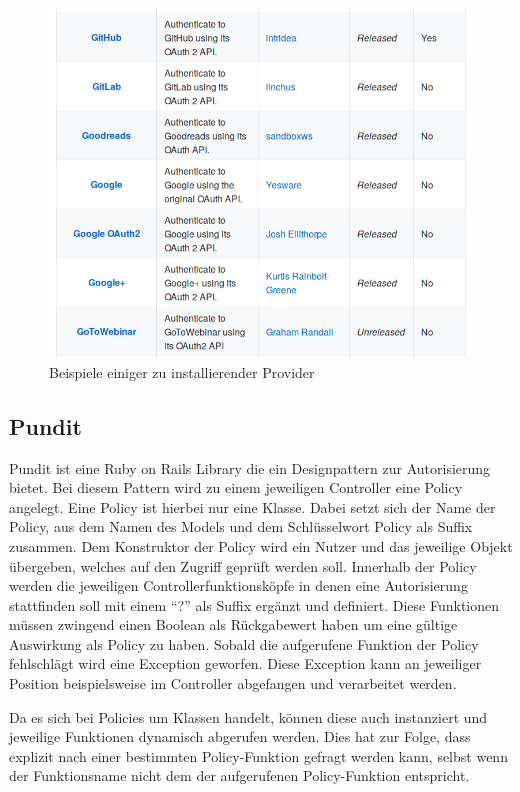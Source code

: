 \documentclass[11pt]{article}
\begin{document}
	\begin{figure}[h]
		\includegraphics[width=\textwidth]{images/provider-list.png}
		\caption{Beispiele einiger zu installierender Provider}
		\label{fig:provider-list}
	\end{figure}

	\subsection{Pundit}
	\label{sec: pundit}
	Pundit ist eine Ruby on Rails Library die ein Designpattern zur Autorisierung bietet. Bei diesem Pattern wird zu einem jeweiligen Controller eine Policy angelegt. Eine Policy ist hierbei nur eine Klasse. Dabei setzt sich der Name der Policy, aus dem Namen des Models und dem Schlüsselwort Policy als Suffix zusammen. Dem Konstruktor der Policy wird ein Nutzer und das jeweilige Objekt übergeben, welches auf den Zugriff geprüft werden soll. Innerhalb der Policy werden die jeweiligen Controllerfunktionsköpfe in denen eine Autorisierung stattfinden soll mit einem \enquote{?} als Suffix ergänzt und definiert. Diese Funktionen müssen zwingend einen Boolean als Rückgabewert haben um eine gültige Auswirkung als Policy zu haben. Sobald die aufgerufene Funktion der Policy fehlschlägt wird eine Exception geworfen. Diese Exception kann an jeweiliger Position beispielsweise im Controller abgefangen und verarbeitet werden. 
	
	Da es sich bei Policies um Klassen handelt, können diese auch instanziert und jeweilige Funktionen dynamisch abgerufen werden. Dies hat zur Folge, dass explizit nach einer bestimmten Policy-Funktion gefragt werden kann, selbst wenn der Funktionsname nicht dem der aufgerufenen Policy-Funktion entspricht.
	
\end{document}

